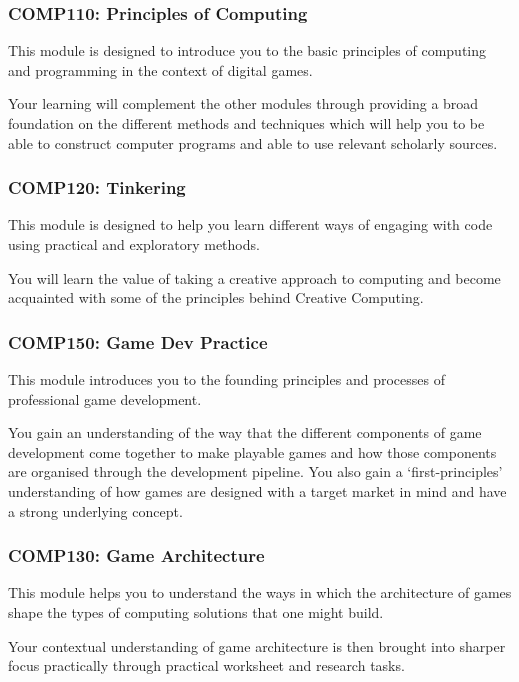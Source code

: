 \begin{frame}
	\frametitle{COMP110: Principles of Computing}
	
	This module is designed to introduce you to the basic principles of computing and programming in the context of digital games.
	
	\vspace{2em}
	
	Your learning will complement the other modules through providing a broad foundation on the different methods and techniques which will help you to be able to construct computer programs and able to use relevant scholarly sources. 

\end{frame}

\begin{frame}
	\frametitle{COMP120: Tinkering}
	
	This module is designed to help you learn different ways of engaging with code using practical and exploratory methods. 
	
	\vspace{2em}
	
	You will learn the value of taking a creative approach to computing and become acquainted with some of the principles behind Creative Computing. 

\end{frame}

\begin{frame}
	\frametitle{COMP150: Game Dev Practice}
	
	This module introduces you to the founding principles and processes of professional game development. 
	
	\vspace{2em}
	
	You gain an understanding of the way that the different components of game development come together to make playable games and how those components are organised through the development pipeline. You also gain a `first-principles' understanding of how games are designed with a target market in mind and have a strong underlying concept.

\end{frame}

\begin{frame}
	\frametitle{COMP130: Game Architecture}
	
	This module helps you to understand the ways in which the architecture of games shape the types of computing solutions that one might build. 
	
	\vspace{2em}
	
	Your contextual understanding of game architecture is then brought into sharper focus practically through practical worksheet and research tasks.

\end{frame}

